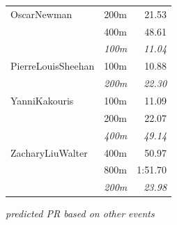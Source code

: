 \documentclass[11pt]{article}
\begin{document}
\begin{tabularx}{\textwidth}{lXr}
\midrule
OscarNewman & 200m & 21.53 \\
& 400m & 48.61 \\
& \textit{100m} & \textit{11.04} \\
\midrule
PierreLouisSheehan & 100m & 10.88 \\
& \textit{200m} & \textit{22.30} \\
\midrule
YanniKakouris & 100m & 11.09 \\
& 200m & 22.07 \\
& \textit{400m} & \textit{49.14} \\
\midrule
ZacharyLiuWalter & 400m & 50.97 \\
& 800m & 1:51.70 \\
& \textit{200m} & \textit{23.98} \\
\midrule
\bottomrule
\end{tabularx}
\smallskip
\textit{\footnotesize predicted PR based on other events}
\end{document}
